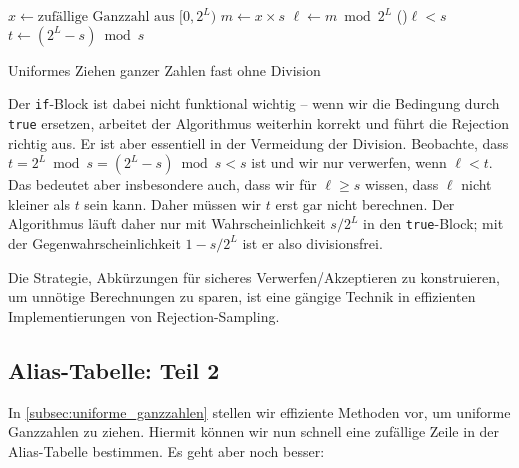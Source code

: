 \begin{algorithm}[H]
    $x \gets \text{zufällige Ganzzahl aus $[0, 2^L)$}$\;
    $m \gets x \times s$\;
    $\ell \gets m \bmod 2^L$\;
    \If(){$\ell < s$}{
        $t \gets (2^L -s) \bmod s$
        \While{$\ell < t$}{
            $x \gets \text{zufällige Ganzzahl aus $[0, 2^L)$}$\;
            $m \gets x \times s$\;
            $\ell \gets m \bmod 2^L$\;
        }
    }
    \caption{Uniformes Ziehen ganzer Zahlen fast ohne Division}
    \label{algo:uniform_lemire}
\end{algorithm}

Der \texttt{if}-Block ist dabei nicht funktional wichtig -- wenn wir die Bedingung durch \texttt{true} ersetzen, arbeitet der Algorithmus weiterhin korrekt und führt die Rejection richtig aus.
Er ist aber essentiell in der Vermeidung der Division.
Beobachte, dass $t = 2^L \bmod s = (2^L - s) \bmod s < s$ ist und wir nur verwerfen, wenn $\ell < t$.
Das bedeutet aber insbesondere auch, dass wir für $\ell \ge s$ wissen, dass $\ell$ nicht kleiner als $t$ sein kann.
Daher müssen wir $t$ erst gar nicht berechnen.
Der Algorithmus läuft daher nur mit Wahrscheinlichkeit $s / 2^L$ in den \texttt{true}-Block; mit der Gegenwahrscheinlichkeit $1 - s/2^L$ ist er also divisionsfrei.

Die Strategie, Abkürzungen für sicheres Verwerfen/Akzeptieren zu konstruieren, um unnötige Berechnungen zu sparen, ist eine gängige Technik in effizienten Implementierungen von Rejection-Sampling.

\subsection{Alias-Tabelle: Teil 2}
In \cref{subsec:uniforme_ganzzahlen} stellen wir effiziente Methoden vor, um uniforme Ganzzahlen zu ziehen.
Hiermit können wir nun schnell eine zufällige Zeile in der Alias-Tabelle bestimmen.
Es geht aber noch besser:

